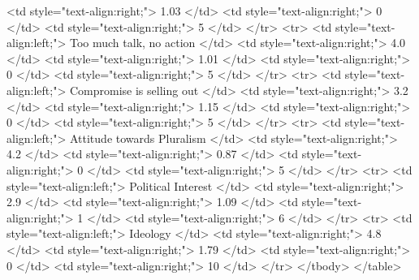    <td style="text-align:right;"> 1.03 </td>
   <td style="text-align:right;"> 0 </td>
   <td style="text-align:right;"> 5 </td>
  </tr>
  <tr>
   <td style="text-align:left;"> Too much talk, no action </td>
   <td style="text-align:right;"> 4.0 </td>
   <td style="text-align:right;"> 1.01 </td>
   <td style="text-align:right;"> 0 </td>
   <td style="text-align:right;"> 5 </td>
  </tr>
  <tr>
   <td style="text-align:left;"> Compromise is selling out </td>
   <td style="text-align:right;"> 3.2 </td>
   <td style="text-align:right;"> 1.15 </td>
   <td style="text-align:right;"> 0 </td>
   <td style="text-align:right;"> 5 </td>
  </tr>
  <tr>
   <td style="text-align:left;"> Attitude towards Pluralism </td>
   <td style="text-align:right;"> 4.2 </td>
   <td style="text-align:right;"> 0.87 </td>
   <td style="text-align:right;"> 0 </td>
   <td style="text-align:right;"> 5 </td>
  </tr>
  <tr>
   <td style="text-align:left;"> Political Interest </td>
   <td style="text-align:right;"> 2.9 </td>
   <td style="text-align:right;"> 1.09 </td>
   <td style="text-align:right;"> 1 </td>
   <td style="text-align:right;"> 6 </td>
  </tr>
  <tr>
   <td style="text-align:left;"> Ideology </td>
   <td style="text-align:right;"> 4.8 </td>
   <td style="text-align:right;"> 1.79 </td>
   <td style="text-align:right;"> 0 </td>
   <td style="text-align:right;"> 10 </td>
  </tr>
</tbody>
</table>
